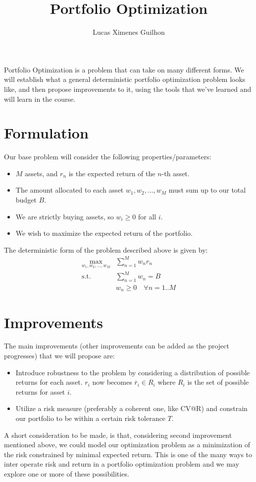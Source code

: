 \documentclass{article}
\title{Portfolio Optimization}
\author{Lucas Ximenes Guilhon}
\begin{document}
\maketitle

Portfolio Optimization is a problem that can take on many different forms. We will establish what a general deterministic portfolio optimization problem looks like, and then
propose improvements to it, using the tools that we've learned and will learn in the course.
\section*{Formulation}
Our base problem will consider the following properties/parameters:
\begin{itemize}
\item $M$ assets, and $r_n$ is the expected return of the $n$-th asset.
\item The amount allocated to each asset $w_1, w_2, \dots, w_M$ must sum up to our total budget $B$.
\item We are strictly buying assets, so $w_i \geq 0$ for all $i$.
\item We wish to maximize the expected return of the portfolio.
\end{itemize}
The deterministic form of the problem described above is given by:
\begin{equation}
  \begin{aligned}
  \max_{w_1, w_2, \dots, w_M} & \sum_{n=1}^M w_n r_n\\
  \textrm{s.t.} \quad & \sum_{n=1}^M w_n = B\\
    & w_n \geq 0 \quad \forall n=1..M
  \end{aligned}
\end{equation}
\section*{Improvements}
The main improvements (other improvements can be added as the project progresses) that we will propose are:
\begin{itemize}
  \item Introduce robustness to the problem by considering a distribution of possible returns for each asset. $r_i$ now becomes $\bar{r}_i \in R_i$ where $R_i$ is the set of possible returns for asset $i$.
  \item Utilize a risk measure (preferably a coherent one, like CV@R) and constrain our portfolio to be within a certain risk tolerance $T$.
\end{itemize}
A short consideration to be made, is that, considering second improvement mentioned above,
we could model our optimization problem as a minimization of the risk constrained by minimal expected return. This is one of the many ways to inter operate risk and return in a portfolio optimization problem
and we may explore one or more of these possibilities.
\end{document}
